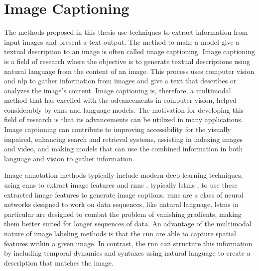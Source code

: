 \section{Image Captioning}

    The methods proposed in this thesis use techniques to extract information from input images and present a text output. The method to make a model give a textual description to an image is often called image captioning.
    Image captioning is a field of research where the objective is to generate textual descriptions using natural language from the content of an image. This process uses computer vision and \gls{nlp} to gather information from images and give a text that describes or analyzes the image's content. Image captioning is, therefore, a multimodal method that has excelled with the advancements in computer vision, helped considerably by \glspl{cnn} and language models. The motivation for developing this field of research is that its advancements can be utilized in many applications. Image captioning can contribute to improving accessibility for the visually impaired, enhancing search and retrieval systems, assisting in indexing images and video, and making models that can use the combined information in both language and vision to gather information. 

    Image annotation methods typically include modern deep learning techniques, using \glspl{cnn} to extract image features and \glspl{rnn} \cite{rumelhartLearningRepresentationsBackpropagating1986}, typically \glspl{lstm} \cite{hochreiterLongShorttermMemory1997}, to use these extracted image features to generate image captions. \glspl{rnn} are a class of neural networks designed to work on data sequences, like natural language. \glspl{lstm} in particular are designed to combat the problem of vanishing gradients, making them better suited for longer sequences of data. An advantage of the multimodal nature of image labeling methods is that the \gls{cnn} are able to capture spatial features within a given image. In contrast, the \gls{rnn} can structure this information by including temporal dynamics and syntaxes using natural language to create a description that matches the image.


